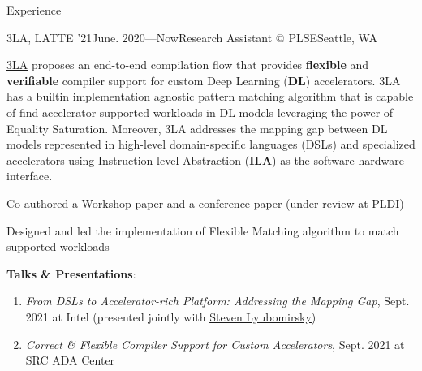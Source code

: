 \documentclass{cv}
\newcommand{\myul}[2][blue]{\setulcolor{#1}\ul{#2}\setulcolor{blue}}
\begin{document}
    \begin{rSection}{Experience}
        \begin{rSubsection}{3LA, LATTE '21}{June. 2020---Now}{Research Assistant @ PLSE}{Seattle, WA}
            \item \href{https://capra.cs.cornell.edu/latte21/paper/30.pdf}{\color{blue} \myul{3LA}} proposes an end-to-end compilation flow that provides \textbf{flexible} and \textbf{verifiable} compiler support for custom Deep Learning (\textbf{DL}) accelerators. 3LA has a builtin implementation agnostic pattern matching algorithm that is capable of find accelerator supported workloads in DL models leveraging the power of Equality Saturation. Moreover, 3LA addresses the mapping gap between DL models represented in high-level domain-specific languages (DSLs) and specialized accelerators using Instruction-level Abstraction (\textbf{ILA}) as the software-hardware interface.
            \item Co-authored a Workshop paper and a conference paper (under review at PLDI)
            \item Designed and led the implementation of Flexible Matching algorithm to match supported workloads
            \item \textbf{Talks \& Presentations}:
                \begin{enumerate}
					\setlength{\itemsep}{1pt}
					\setlength{\parskip}{0pt}
					\setlength{\parsep}{0pt}
                    \item \textit{From DSLs to Accelerator-rich Platform: Addressing the Mapping Gap}, Sept. 2021 at Intel (presented jointly with \href{https://homes.cs.washington.edu/~sslyu/}{\color{blue} \myul {Steven Lyubomirsky}})
                    \item \textit{Correct \& Flexible Compiler Support for Custom Accelerators}, Sept. 2021 at SRC ADA Center
                \end{enumerate} 
        \end{rSubsection}


\end{rSection}
\end{document}
